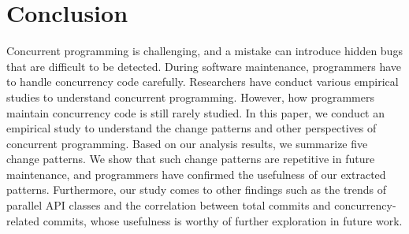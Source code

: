 \section{Conclusion}
Concurrent programming is challenging, and a mistake can introduce hidden bugs that are difficult to be detected. During software maintenance, programmers have to handle concurrency code carefully. Researchers have conduct various empirical studies to understand concurrent programming. However, how programmers maintain concurrency code is still rarely studied. In this paper, we conduct an empirical study to understand the change patterns and other perspectives of concurrent programming. Based on our analysis results, we summarize five change patterns. We show that such change patterns are repetitive in future maintenance, and programmers have confirmed the usefulness of our extracted patterns. Furthermore, our study comes to other findings such as the trends of parallel API classes and the correlation between total commits and concurrency-related commits, whose usefulness is worthy of further exploration in future work. 
